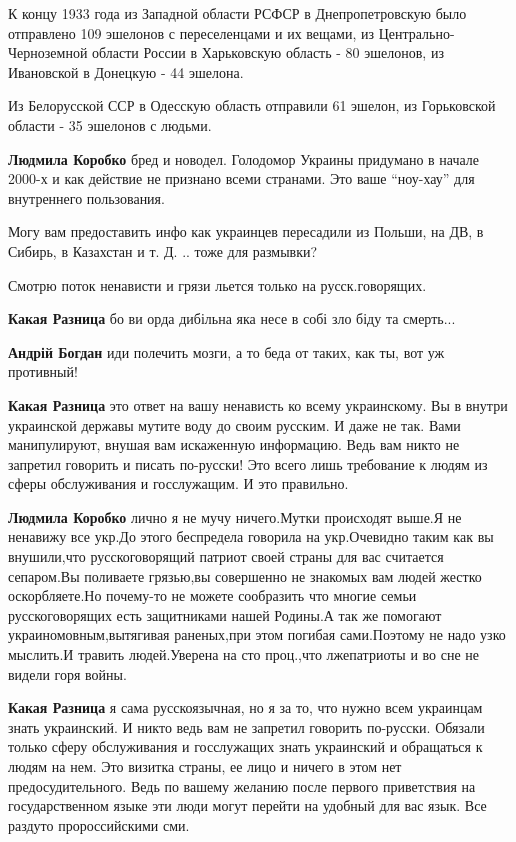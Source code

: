 \begin{itemize}
{\begin{itemize}
К концу 1933 года из Западной области РСФСР в Днепропетровскую было отправлено
109 эшелонов с переселенцами и их вещами, из Центрально-Черноземной области
России в Харьковскую область - 80 эшелонов, из Ивановской в Донецкую - 44
эшелона.

Из Белорусской ССР в Одесскую область отправили 61 эшелон, из Горьковской
области - 35 эшелонов с людьми.


\textbf{Людмила Коробко} бред и новодел. Голодомор Украины придумано в начале
2000-х и как действие не признано всеми странами. Это ваше \enquote{ноу-хау} для
внутреннего пользования.

Могу вам предоставить инфо как украинцев пересадили из Польши, на ДВ, в Сибирь,
в Казахстан и т. Д. .. тоже для размывки?

\end{itemize}

Смотрю поток ненависти и грязи льется только на русск.говорящих.

\begin{itemize}

\textbf{Какая Разница} бо ви орда дибільна яка несе в собі зло біду та смерть...

\textbf{Андрій Богдан} иди полечить мозги, а то беда от таких, как ты, вот уж противный!

\textbf{Какая Разница} это ответ на вашу ненависть ко всему украинскому. Вы в
внутри украинской державы мутите воду до своим русским. И даже не так. Вами
манипулируют, внушая вам искаженную информацию. Ведь вам никто не запретил
говорить и писать по-русски! Это всего лишь требование к людям из сферы
обслуживания и госслужащим. И это правильно.


\textbf{Людмила Коробко} лично я не мучу ничего.Мутки происходят выше.Я не
ненавижу все укр.До этого беспредела говорила на укр.Очевидно таким как вы
внушили,что русскоговорящий патриот своей страны для вас считается сепаром.Вы
поливаете грязью,вы совершенно не знакомых вам людей жестко оскорбляете.Но
почему-то не можете сообразить что многие семьи русскоговорящих есть
защитниками нашей Родины.А так же помогают украиномовным,вытягивая раненых,при
этом погибая сами.Поэтому не надо узко мыслить.И травить людей.Уверена на сто
проц.,что лжепатриоты и во сне не видели горя войны.

\textbf{Какая Разница} я сама русскоязычная, но я за то, что нужно всем украинцам знать украинский. И никто ведь вам не запретил говорить по-русски. Обязали только сферу обслуживания и госслужащих знать украинский и обращаться к людям на нем. Это визитка страны, ее лицо и ничего в этом нет предосудительного. Ведь по вашему желанию после первого приветствия на государственном языке эти люди могут перейти на удобный для вас язык. Все раздуто пророссийскими сми.


\end{itemize}}
\end{itemize}
